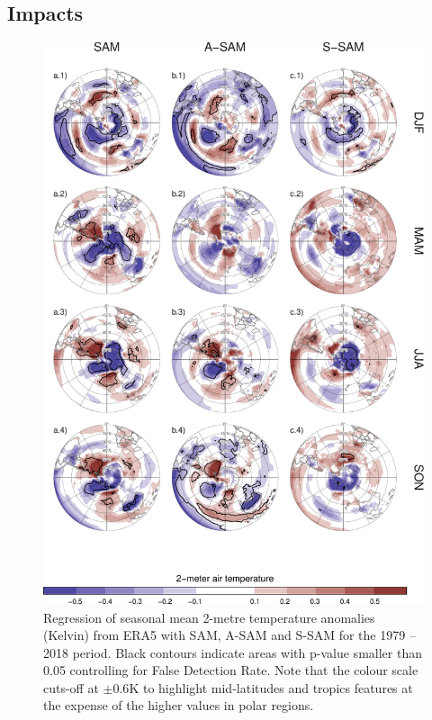 \documentclass[smallextended]{svjour3}       %
\begin{document}
\hypertarget{impacts}{%
\subsection{Impacts}\label{impacts}}



\begin{figure}
\includegraphics{regr-air-season-1} \caption{Regression of seasonal mean 2-metre temperature anomalies (Kelvin) from ERA5 with SAM, A\nobreakdash-SAM and S\nobreakdash-SAM for the 1979 -- 2018 period. Black contours indicate areas with p-value smaller than 0.05 controlling for False Detection Rate. Note that the colour scale cuts-off at \(\pm0.6 \mathrm{K}\) to highlight mid-latitudes and tropics features at the expense of the higher values in polar regions.}\label{fig:regr-air-season}
\end{figure}
\end{document}
